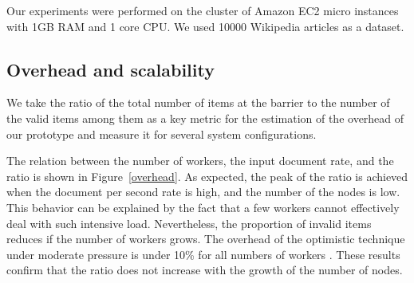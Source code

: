 
Our experiments were performed on the cluster of Amazon EC2 micro instances with 1GB RAM and 1 core CPU. We used 10000 Wikipedia articles as a dataset. 

\subsection{Overhead and scalability}

%
We take the ratio of  the total number of items at the barrier   to the number of the valid items among them as a key metric for the estimation of the overhead of our prototype and measure it for several system configurations.

The relation between the number of workers, the input  document  rate, and the  ratio is shown in Figure~\ref{overhead}. 
As expected, the peak of the ratio is achieved when the document per second rate is high, and the number of the nodes is low. This behavior can be explained by the fact that a few workers cannot effectively deal with such intensive load. Nevertheless, the proportion of invalid items reduces if the number of workers grows. 
The   overhead of  the optimistic technique under moderate pressure  is under 10\% for all  numbers of workers .
These results confirm that the ratio does not increase with the growth of the number of nodes.

